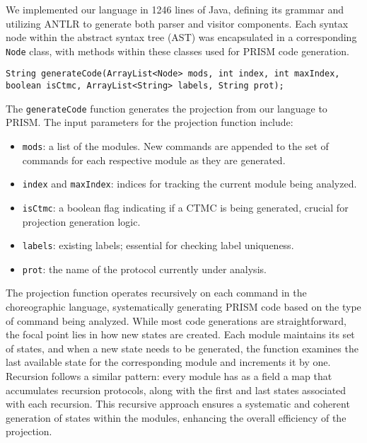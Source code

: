 We implemented our language in 1246 lines of Java, defining its grammar and utilizing ANTLR \cite{ANTLR} to generate both parser and visitor components. Each syntax node within the abstract syntax tree (AST) was encapsulated in a corresponding {\tt Node} class, with methods within these classes used for PRISM code generation.
\begin{lstlisting}[language=Eclipse,caption=The \texttt{generateCode} function.,label=genfun1,numbers=none]
	String generateCode(ArrayList<Node> mods, int index, int maxIndex, boolean isCtmc, ArrayList<String> labels, String prot);	
\end{lstlisting}
The {\tt generateCode} function generates the projection from our language to PRISM.
The input parameters for the projection function include:
\begin{itemize}
\item \texttt{mods}: a list of the modules.  New commands are appended to the set of commands for each respective module as they are generated.
\item \texttt{index} and \texttt{maxIndex}: indices for tracking the current module being analyzed.
\item \texttt{isCtmc}: a boolean flag indicating if a CTMC is being generated, crucial for projection generation logic.
\item \texttt{labels}: existing labels; essential for checking label uniqueness.
\item \texttt{prot}: the name of the protocol currently under analysis.
\end{itemize}
The projection function operates recursively on each command in the choreographic language, systematically generating PRISM code based on the type of command being analyzed. While most code generations are straightforward, the focal point lies in how new states are created. Each module maintains its set of states, and when a new state needs to be generated, the function examines the last available state for the corresponding module and increments it by one.
Recursion follows a similar pattern: every module has as a field a map that accumulates recursion protocols, along with the first and last states associated with each recursion. This recursive approach ensures a systematic and coherent generation of states within the modules, enhancing the overall efficiency of the projection.

